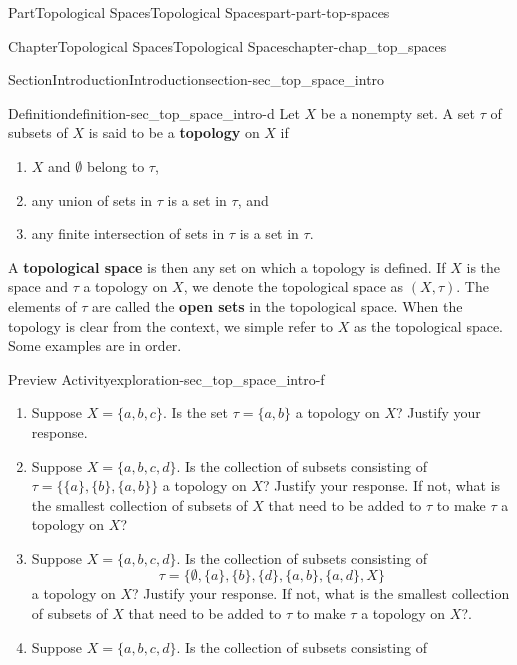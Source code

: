 \documentclass[oneside,10pt,]{book}
\newcommand{\terminology}[1]{\textbf{#1}}
\numberwithin{equation}{chapter}
\begin{document}
\begin{partptx}{Part}{Topological Spaces}{}{Topological Spaces}{}{}{part-part-top-spaces}
\begin{chapterptx}{Chapter}{Topological Spaces}{}{Topological Spaces}{}{}{chapter-chap_top_spaces}
\begin{sectionptx}{Section}{Introduction}{}{Introduction}{}{}{section-sec_top_space_intro}
\begin{definition}{Definition}{}{definition-sec_top_space_intro-d}%
%
Let \(X\) be a nonempty set. A set \(\tau\)\footnotemark{} of subsets of \(X\) is said to be a \terminology{topology} on \(X\) if%
\begin{enumerate}
\item{}\(X\) and \(\emptyset\) belong to \(\tau\),%
\item{}any union of sets in \(\tau\) is a set in \(\tau\), and%
\item{}any finite intersection of sets in \(\tau\) is a set in \(\tau\).%
\end{enumerate}
%
\end{definition}
%
 A \terminology{topological space} is then any set on which a topology is defined. If \(X\) is the space and \(\tau\) a topology on \(X\), we denote the topological space as \((X, \tau)\). The elements of \(\tau\) are called the \terminology{open sets} in the topological space. When the topology is clear from the context, we simple refer to \(X\) as the topological space. Some examples are in order.%
\begin{exploration}{Preview Activity}{}{exploration-sec_top_space_intro-f}%
\begin{enumerate}[font=\bfseries,label=(\alph*),ref=\alph*]%
\item{}Suppose \(X = \{ a, b, c\}\). Is the set \(\tau = \{a,b\}\) a topology on \(X\)? Justify your response.%
\item{}Suppose \(X= \{a,b,c,d\}\). Is the collection of subsets consisting of \(\tau = \{ \{a\}, \{b\}, \{a,b\} \}\) a topology on \(X\)? Justify your response. If not, what is the smallest collection of subsets of \(X\) that need to be added to \(\tau\) to make \(\tau\) a topology on \(X\)?%
\item{}Suppose \(X= \{a,b,c,d\}\). Is the collection of subsets consisting of%
\begin{equation*}
\tau = \{\emptyset, \{a\}, \{b\}, \{d\}, \{a,b\}, \{a,d\}, X \}
\end{equation*}
a topology on \(X\)? Justify your response. If not, what is the smallest collection of subsets of \(X\) that need to be added to \(\tau\) to make \(\tau\) a topology on \(X\)?.%
\item{}Suppose \(X= \{a,b,c,d\}\). Is the collection of subsets consisting of%

\end{enumerate}
\end{exploration}
\end{sectionptx}
\end{chapterptx}
\end{partptx}
\end{document}
